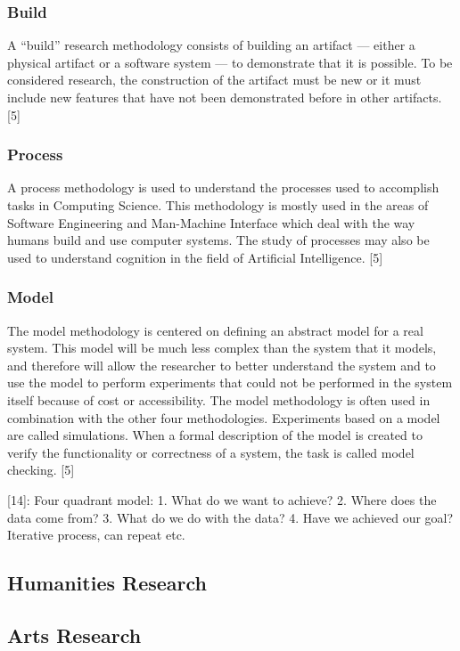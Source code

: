 \subsubsection*{Build}

A ``build'' research methodology consists of building an artifact — either a physical artifact or a software system — to demonstrate that it is possible. To be considered research, the construction of the artifact must be new or it must include new features that have not been demonstrated before in other artifacts. [5]

\subsubsection*{Process}

A process methodology is used to understand the processes used to accomplish tasks in Computing Science. This methodology is mostly used in the areas of Software Engineering and Man-Machine Interface which deal with the way humans build and use computer systems. The study of processes may also be used to understand cognition in the field of Artificial Intelligence. [5]

\subsubsection*{Model}

The model methodology is centered on defining an abstract model for a real system. This model will be much less complex than the system that it models, and therefore will allow the researcher to better understand the system and to use the model to perform experiments that could not be performed in the system itself because of cost or accessibility. The model methodology is often used in combination with the other four methodologies. Experiments based on a model are called simulations. When a formal description of the model is created to verify the functionality or correctness of a system, the task is called model checking. [5]

[14]:
Four quadrant model:
1.	What do we want to achieve?
2.	Where does the data come from?
3.	What do we do with the data?
4.	Have we achieved our goal?
Iterative process, can repeat etc.


\subsection{Humanities Research}

\subsection{Arts Research}

